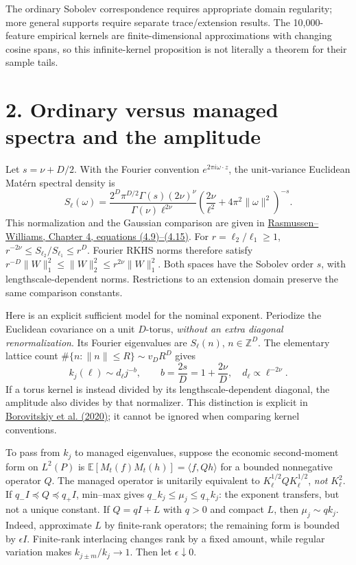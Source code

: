 \documentclass[11pt,letterpaper]{article}
\newcommand{\E}{\mathbb E}
\begin{document}
The ordinary Sobolev correspondence requires appropriate domain regularity;
more general supports require separate trace/extension results. The 10,000-feature
empirical kernels are finite-dimensional approximations with changing cosine spans,
so this infinite-kernel proposition is not literally a theorem for their sample tails.

\newpage
\section*{2. Ordinary versus managed spectra and the amplitude}
Let $s=\nu+D/2$. With the Fourier convention $e^{2\pi i\omega\cdot z}$,
the unit-variance Euclidean Mat\'ern spectral density is
\[
 S_\ell(\omega)=\frac{2^D\pi^{D/2}\Gamma(s)(2\nu)^\nu}{\Gamma(\nu)\ell^{2\nu}}
 \left(\frac{2\nu}{\ell^2}+4\pi^2\|\omega\|^2\right)^{-s}.
\]
This normalization and the Gaussian comparison are given in
\href{https://gaussianprocess.org/gpml/chapters/RW4.pdf}{Rasmussen--Williams,
Chapter 4, equations (4.9)--(4.15)}. For $r=\ell_2/\ell_1\geq1$,
$r^{-2\nu}\leq S_{\ell_2}/S_{\ell_1}\leq r^D$. Fourier RKHS norms therefore
satisfy $r^{-D}\|W\|_1^2\leq\|W\|_2^2\leq r^{2\nu}\|W\|_1^2$.
Both spaces have the Sobolev order $s$, with lengthscale-dependent norms.
Restrictions to an extension domain preserve the same comparison constants.

Here is an explicit sufficient model for the nominal exponent. Periodize the
Euclidean covariance on a unit $D$-torus, \emph{without an extra diagonal
renormalization}. Its Fourier eigenvalues are $S_\ell(n)$, $n\in\mathbb Z^D$.
The elementary lattice count $\#\{n:\|n\|\leq R\}\sim v_DR^D$ gives
\[
 k_j(\ell)\sim d_\ell j^{-b},\qquad b=\frac{2s}{D}=1+\frac{2\nu}{D},
 \quad d_\ell\propto\ell^{-2\nu}.
\]
If a torus kernel is instead divided by its lengthscale-dependent diagonal,
the amplitude also divides by that normalizer. This distinction is explicit in
\href{https://arxiv.org/abs/2006.10160}{Borovitskiy et al. (2020)}; it cannot be
ignored when comparing kernel conventions.

To pass from $k_j$ to managed eigenvalues, suppose the economic second-moment
form on $L^2(P)$ is $\E[M_t(f)M_t(h)]=\langle f,Qh\rangle$ for a bounded
nonnegative operator $Q$. The managed operator is unitarily equivalent to
$K_\ell^{1/2}QK_\ell^{1/2}$, \emph{not} $K_\ell^2$.
If $q_-I\preceq Q\preceq q_+I$, min--max gives
$q_-k_j\leq\mu_j\leq q_+k_j$: the exponent transfers, but not a unique constant.
If $Q=qI+L$ with $q>0$ and compact $L$, then $\mu_j\sim qk_j$.
Indeed, approximate $L$ by finite-rank operators; the remaining form is bounded
by $\epsilon I$. Finite-rank interlacing changes rank by a fixed amount, while
regular variation makes $k_{j\pm m}/k_j\to1$. Then let $\epsilon\downarrow0$.
\end{document}
